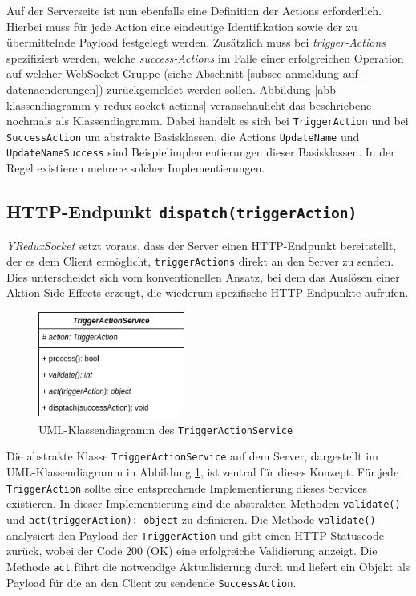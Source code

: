 \documentclass[12pt]{book}          %
\begin{document}
Auf der Serverseite ist nun ebenfalls eine Definition der Actions erforderlich. Hierbei muss für jede Action eine eindeutige Identifikation sowie der zu übermittelnde Payload festgelegt werden. Zusätzlich muss bei \textit{trigger-Actions} spezifiziert werden, welche \textit{success-Actions} im Falle einer erfolgreichen Operation auf welcher WebSocket-Gruppe (siehe Abschnitt \ref{subsec-anmeldung-auf-datenaenderungen}) zurückgemeldet werden sollen. Abbildung \ref{abb-klassendiagramm-y-redux-socket-actions} veranschaulicht das beschriebene nochmals als Klassendiagramm. Dabei handelt es sich bei \texttt{TriggerAction} und bei \texttt{SuccessAction} um abstrakte Basisklassen, die Actions \texttt{UpdateName} und \texttt{UpdateNameSuccess} sind Beispielimplementierungen dieser Basisklassen. In der Regel existieren mehrere solcher Implementierungen.

\subsection{HTTP-Endpunkt \texttt{dispatch(triggerAction)}}
\label{subsec-http-endpunkt-dispatch-action}

\textit{YReduxSocket} setzt voraus, dass der Server einen HTTP-Endpunkt bereitstellt, der es dem Client ermöglicht, \texttt{triggerActions} direkt an den Server zu senden. Dies unterscheidet sich vom konventionellen Ansatz, bei dem das Auslösen einer Aktion Side Effects erzeugt, die wiederum spezifische HTTP-Endpunkte aufrufen.

\begin{figure}[htbp]
\centering
\includegraphics[height=3.5cm]{abbildungen/trigger-action-service.png}
\caption{UML-Klassendiagramm des \texttt{TriggerActionService}}
\label{abb-klassendiagramm-triggeractionservice}
\end{figure}

Die abstrakte Klasse \texttt{TriggerActionService} auf dem Server, dargestellt im UML-Klassendiagramm in Abbildung \ref{abb-klassendiagramm-triggeractionservice}, ist zentral für dieses Konzept. Für jede \texttt{TriggerAction} sollte eine entsprechende Implementierung dieses Services existieren. In dieser Implementierung sind die abstrakten Methoden \texttt{validate()} und \texttt{act(triggerAction): object} zu definieren. Die Methode \texttt{validate()} analysiert den Payload der \texttt{TriggerAction} und gibt einen HTTP-Statuscode zurück, wobei der Code 200 (OK) eine erfolgreiche Validierung anzeigt. Die Methode \texttt{act} führt die notwendige Aktualisierung durch und liefert ein Objekt als Payload für die an den Client zu sendende \texttt{SuccessAction}.
\end{document}
